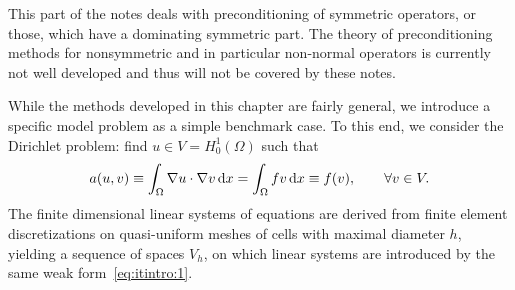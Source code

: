 
\begin{remark}
  This part of the notes deals with preconditioning of symmetric
  operators, or those, which have a dominating symmetric part. The
  theory of preconditioning methods for nonsymmetric and in particular
  non-normal operators is currently not well developed and thus will not
  be covered by these notes. 
\end{remark}

\begin{example}
  While the methods developed in this chapter are fairly general, we
  introduce a specific model problem as a simple benchmark case. To
  this end, we consider the Dirichlet problem: find $u\in V =
  H^1_0(\Omega)$ such that
  \begin{gather}
    \label{eq:itintro:1}
    a(u,v) \equiv \int_\Omega \nabla u\cdot \nabla v \,\mathrm{d} x
    = \int_\Omega f v \,\mathrm{d} x \equiv f(v),
    \qquad \forall v\in V.
  \end{gather}
  The finite dimensional linear systems of equations are derived from
  finite element discretizations on quasi-uniform meshes of cells with
  maximal diameter $h$, yielding a sequence of spaces $V_h$, on which
  linear systems are introduced by the same weak
  form~\eqref{eq:itintro:1}.
\end{example}

